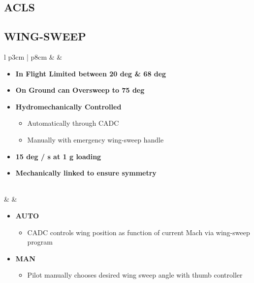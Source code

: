 \documentclass[8pt,usenames,dvipsnames,twoside]{article}
\begin{document}
		\subsection{ACLS}
	
		\subsection{WING-SWEEP}
		\begin{center}
			\begin{longtable}{l p{3cm} | p{8cm}}
				\toprule
				\textbullet &  & 
				\begin{minipage}[t]{\linewidth}
					\vspace{-7pt}
					\begin{itemize}
						\item \textbf{In Flight Limited between 20 deg \& 68 deg}
						\item \textbf{On Ground can Oversweep to 75 deg}
						\item \textbf{Hydromechanically Controlled}
						\begin{itemize}
							\item Automatically through CADC
							\item Manually with emergency wing-sweep handle
						\end{itemize}
						\item \textbf{15 deg / s at 1 g loading}
						\item \textbf{Mechanically linked to ensure symmetry}
					\end{itemize}
				\end{minipage} \\
				\midrule
				\textbullet &  & 
				\begin{minipage}[t]{\linewidth}
					\vspace{-7pt}
					\begin{itemize}
						\item \textbf{AUTO}
						\begin{itemize}
							\item CADC controls wing position as function of current Mach via wing-sweep program
						\end{itemize}
						\item \textbf{MAN}
						\begin{itemize}
							\item Pilot manually chooses desired wing sweep angle with thumb controller
						\end{itemize}

\end{itemize}
\end{minipage}
\end{longtable}
\end{center}
\end{document}
